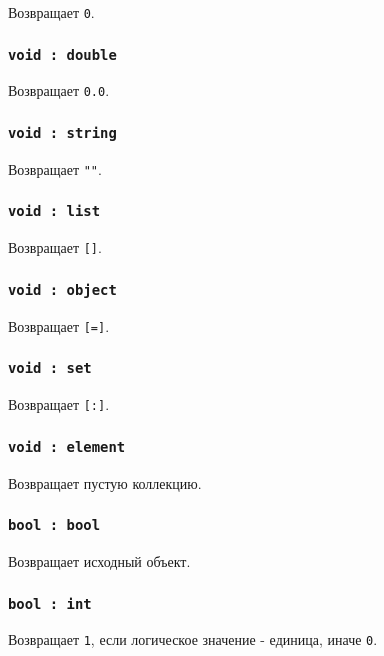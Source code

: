 Возвращает \texttt{0}.

\subsubsection{\texttt{void : double}}

Возвращает \texttt{0.0}.

\subsubsection{\texttt{void : string}}

Возвращает \texttt{""}.

\subsubsection{\texttt{void : list}}

Возвращает \texttt{[]}.

\subsubsection{\texttt{void : object}}

Возвращает \texttt{[=]}.

\subsubsection{\texttt{void : set}}

Возвращает \texttt{[:]}.

\subsubsection{\texttt{void : element}}

Возвращает пустую коллекцию.

\subsubsection{\texttt{bool : bool}}

Возвращает исходный объект.

\subsubsection{\texttt{bool : int}}

Возвращает \texttt{1}, если логическое значение - единица, иначе \texttt{0}.

